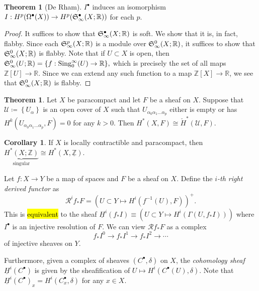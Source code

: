 \documentclass[10pt,letterpaper,cm]{nupset}
\theoremstyle{definition}
\theoremstyle{theorem}
\newtheorem{theorem}[definition]{Theorem}
\newtheorem{corollary}[definition]{Corollary}
\theoremstyle{remark}
\newcommand{\R}{\mathbb{R}}
\newcommand{\Z}{\mathbb Z}
\newcommand{\1}{\mathbb{1}}
\newcommand{\0}{\vec 0}
\DeclareMathOperator{\sing}{Sing}
\begin{document}
\begin{theorem}[De Rham]
$I^{\bullet}$ induces an isomorphism $I: H^{p}(\Omega^{\bullet}(X)) \to H^{p}(\frak{S}_{\infty}^{\bullet}(X; \R))$ for each $p$.
\end{theorem}
\begin{proof}
It suffices to show that $\frak{S}^{\bullet}_{\infty}(X; \R)$ is soft. We show that it is, in fact, flabby. Since each $\frak{S}^p_{\infty}(X; \R)$ is a module over $\frak{S}^0_{\infty}(X; \R)$, it suffices to show that $\frak{S}^0_{\infty}(X; \R)$ is flabby. Note that if $U \subset X$ is open, then  $\frak{S}^0_{\infty}(U; \R) = \{f : \sing_0^{\infty}(U) \to \R   \},$ which is precisely the set of all  maps $\Z[U] \to \R$. Since we can extend any such function to a map $\Z[X] \to \R$, we see that $\frak{S}^0_{\infty}(X; \R)$ is flabby. 
\end{proof}

\begin{theorem}
Let $X$ be paracompact and let $F$ be a sheaf on $X$. Suppose that $\mathcal{U} \coloneqq \left\{U_{\alpha}\right\}$ is an open cover of $X$ such that $U_{\alpha_0\alpha_1\ldots \alpha_p}$ either is empty or has $H^k(U_{\alpha_0\alpha_1\ldots \alpha_p}, F) =0$ for any $k>0$. Then $H^{\ast}(X, F) \cong \check{H}^{\ast}(\mathcal{U}, F)$.
\end{theorem}

\begin{corollary}
If $X$ is locally contractible and paracompact, then $\underbrace{H^{\ast}(X; \Z)}_{\text{singular}} \cong H^{\ast}(X, \underline{\Z})$.
\end{corollary}

\medskip


Let $f : X \to Y$ be a map of spaces and $F$ be a sheaf on $X$. Define the \textit{$i$-th right derived functor} as $$\mathcal{R}^i{f_{\ast}{F}} = ( U\subset Y \mapsto H^i(f^{-1}(U), F)  )^+.$$ This is \hl{equivalent} to the sheaf $\underline{H}^i(f_{\ast}{I})\equiv (U\subset Y \mapsto H^i(\Gamma(U, f_{\ast}I)))$ where $I^{\bullet}$ is an injective resolution of $F$. We can view $\mathcal{R}f_{\ast}F$ as a complex $$f_{\ast}I^0 \to f_{\ast}I^1 \to f_{\ast}I^2 \to \cdots$$ of injective sheaves on $Y$.

Furthermore, given a complex of sheaves $(C^{\bullet}, \delta)$ on $X$, the \textit{cohomology sheaf $\underline{H}^i(C^{\bullet})  $} is given by the sheafification of $U \mapsto H^i(C^{\bullet}(U), \delta)$. Note that $\underline{H}^i(C^{\bullet})_x = H^i(C^{\bullet}_x, \delta)$ for any $x\in X$.
\end{document}
